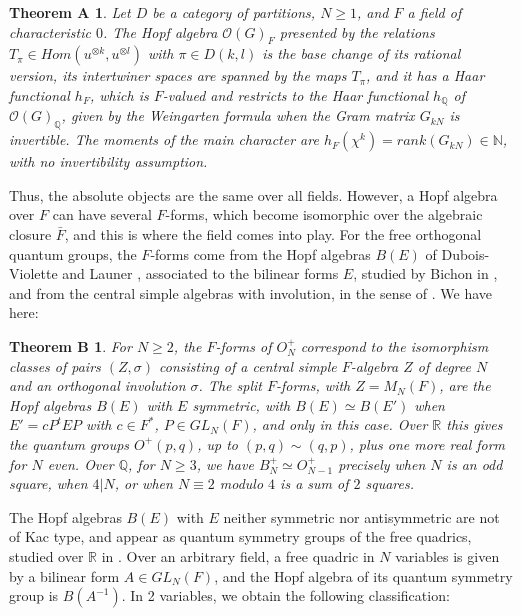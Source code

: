 \documentclass[11pt]{amsart}
\newtheorem*{theorema}{Theorem A}
\newtheorem*{theoremb}{Theorem B}
\theoremstyle{definition}
\begin{document}
\begin{theorema}
Let $D$ be a category of partitions, $N\geq1$, and $F$ a field of characteristic $0$. The Hopf algebra $\mathcal O(G)_F$ presented by the relations $T_\pi\in Hom(u^{\otimes k},u^{\otimes l})$ with $\pi\in D(k,l)$ is the base change of its rational version, its intertwiner spaces are spanned by the maps $T_\pi$, and it has a Haar functional $h_F$, which is $F$-valued and restricts to the Haar functional $h_{\mathbb Q}$ of $\mathcal O(G)_{\mathbb Q}$, given by the Weingarten formula when the Gram matrix $G_{kN}$ is invertible. The moments of the main character are $h_F(\chi^k)=rank(G_{kN})\in\mathbb N$, with no invertibility assumption.
\end{theorema}

Thus, the absolute objects are the same over all fields. However, a Hopf algebra over $F$ can have several $F$-forms, which become isomorphic over the algebraic closure $\bar F$, and this is where the field comes into play. For the free orthogonal quantum groups, the $F$-forms come from the Hopf algebras $B(E)$ of Dubois-Violette and Launer \cite{dla}, associated to the bilinear forms $E$, studied by Bichon in \cite{bic}, and from the central simple algebras with involution, in the sense of \cite{kmr}. We have here:

\begin{theoremb}
For $N\geq2$, the $F$-forms of $O_N^+$ correspond to the isomorphism classes of pairs $(Z,\sigma)$ consisting of a central simple $F$-algebra $Z$ of degree $N$ and an orthogonal involution $\sigma$. The split $F$-forms, with $Z=M_N(F)$, are the Hopf algebras $B(E)$ with $E$ symmetric, with $B(E)\simeq B(E')$ when $E'=cP^tEP$ with $c\in F^*$, $P\in GL_N(F)$, and only in this case. Over $\mathbb R$ this gives the quantum groups $O^+(p,q)$, up to $(p,q)\sim(q,p)$, plus one more real form for $N$ even. Over $\mathbb Q$, for $N\geq3$, we have $B_N^+\simeq O_{N-1}^+$ precisely when $N$ is an odd square, when $4|N$, or when $N\equiv2$ modulo $4$ is a sum of $2$ squares.
\end{theoremb}

The Hopf algebras $B(E)$ with $E$ neither symmetric nor antisymmetric are not of Kac type, and appear as quantum symmetry groups of the free quadrics, studied over $\mathbb R$ in \cite{fba}. Over an arbitrary field, a free quadric in $N$ variables is given by a bilinear form $A\in GL_N(F)$, and the Hopf algebra of its quantum symmetry group is $B(A^{-1})$. In 2 variables, we obtain the following classification:
\end{document}
